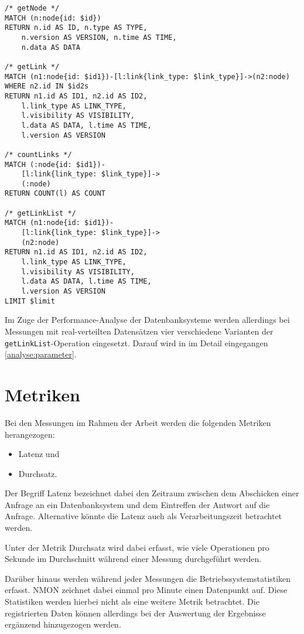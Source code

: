 \begin{lstlisting}[label=src:cypher_queries,caption={Cypher Queries (regulär)},language=CQL]
/* getNode */
MATCH (n:node{id: $id}) 
RETURN n.id AS ID, n.type AS TYPE, 
    n.version AS VERSION, n.time AS TIME, 
    n.data AS DATA

/* getLink */
MATCH (n1:node{id: $id1})-[l:link{link_type: $link_type}]->(n2:node) 
WHERE n2.id IN $id2s 
RETURN n1.id AS ID1, n2.id AS ID2, 
    l.link_type AS LINK_TYPE, 
    l.visibility AS VISIBILITY, 
    l.data AS DATA, l.time AS TIME, 
    l.version AS VERSION

/* countLinks */
MATCH (:node{id: $id1})-
    [l:link{link_type: $link_type}]->
    (:node) 
RETURN COUNT(l) AS COUNT

/* getLinkList */
MATCH (n1:node{id: $id1})-
    [l:link{link_type: $link_type}]->
    (n2:node) 
RETURN n1.id AS ID1, n2.id AS ID2, 
    l.link_type AS LINK_TYPE, 
    l.visibility AS VISIBILITY, 
    l.data AS DATA, l.time AS TIME, 
    l.version AS VERSION 
LIMIT $limit
\end{lstlisting}

Im Zuge der Performance-Analyse der Datenbanksysteme werden allerdings bei Messungen mit real-verteilten Datensätzen vier verschiedene Varianten der \texttt{getLinkList}-Operation eingesetzt. Darauf wird in im Detail eingegangen \autoref{analyse:parameter}.

\section{Metriken}
\label{analyse:metriken}
Bei den Messungen im Rahmen der Arbeit werden die folgenden Metriken herangezogen: 

\begin{itemize}
    \item Latenz und 
    \item Durchsatz.
\end{itemize}

Der Begriff Latenz bezeichnet dabei den Zeitraum zwischen dem Abschicken einer Anfrage an ein Datenbanksystem und dem Eintreffen der Antwort auf die Anfrage. Alternative könnte die Latenz auch als Verarbeitungszeit betrachtet werden. 

Unter der Metrik Durchsatz wird dabei erfasst, wie viele Operationen pro Sekunde im Durchschnitt während einer Messung durchgeführt werden. 

Darüber hinaus werden während jeder Messungen die Betriebssystemstatistiken erfasst. NMON zeichnet dabei einmal pro Minute einen Datenpunkt auf. Diese Statistiken werden hierbei nicht als eine weitere Metrik betrachtet. Die registrierten Daten können allerdings bei der Auswertung der Ergebnisse ergänzend hinzugezogen werden.

